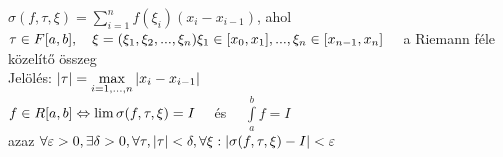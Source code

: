 \documentclass[a4paper,11pt]{article}
\begin{document}
 $\sigma(f,\tau,\xi)=\sum\limits_{i=1}^{n}f(\xi_i)(x_i-x_{i-1})$, ahol
\\[0.2cm]$\tau\in F[a,b],\quad\xi=(\xi_1,\xi_2,...,\xi_n)\\[0.3cm]
\xi_1\in[x_0,x_1],...,\xi_n\in[x_{n-1},x_n]\quad$ a Riemann féle közelítő
összeg\\[0.2cm]Jelölés: $\abs{\tau}=\max\limits_{i=1,...,n}\abs{x_i-x_{i-1}}$
\\[0.2cm]\tetel $f\in R[a,b]\Leftrightarrow\lim\sigma(f,\tau,\xi)=I\quad$ és
$\quad\int\limits_{a}^{b}f=I$\\[0.2cm]azaz $\forall\varepsilon>0,
\exists\delta>0,\forall\tau,\abs{\tau}<\delta,\forall\xi:
\abs{\sigma(f,\tau,\xi)-I}<\varepsilon$
\end{document}
